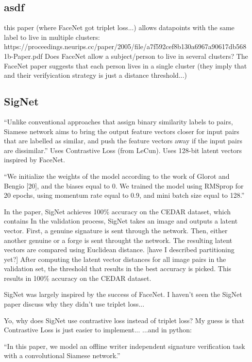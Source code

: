 \subsection{asdf}
this paper (where FaceNet got triplet loss...) allows datapoints with the same label to live in multiple clusters:
https://proceedings.neurips.cc/paper/2005/file/a7f592cef8b130a6967a90617db5681b-Paper.pdf
Does FaceNet allow a subject/person to live in several clusters?
The FaceNet paper suggests that each person lives in a single cluster (they imply that and their verifyication strategy is just a distance threshold...)

\subsection{SigNet}
``Unlike conventional approaches that assign
binary similarity labels to pairs, Siamese network aims to bring
the output feature vectors closer for input pairs that are labelled
as similar, and push the feature vectors away if the input pairs
are dissimilar.''
Uses Contrastive Loss (from LeCun).
Uses 128-bit latent vectors inspired by FaceNet.

``We initialize the weights of the model according to the work
of Glorot and Bengio [20], and the biases equal to 0. We trained
the model using RMSprop for 20 epochs, using momentum rate
equal to 0.9, and mini batch size equal to 128.''

In the paper, SigNet achieves 100\% accuracy on the CEDAR dataset, which contains 
In the validation process, SigNet takes an image and outputs a latent vector.
First, a genuine signature is sent through the network.
Then, either another genuine or a forge is sent throught the network.
The resulting latent vectors are compared using Euclidean distance.
[have I described partitioning yet?]
After computing the latent vector distances for all image pairs in the validation set, the threshold that results in the best accuracy is picked.
This results in 100\% accuracy on the CEDAR dataset.

SigNet was largely inspired by the success of FaceNet.
I haven't seen the SigNet paper discuss why they didn't use triplet loss...

Yo, why does SigNet use contrastive loss instead of triplet loss?
    My guess is that Contrastive Loss is just easier to implement...
\cite{sig_net}
\cite{GitHub_sounakdey}
...and in python: \cite{GitHub_signet_pytorch}

``In this paper, we model an offline writer independent
signature verification task with a convolutional Siamese network.''\cite{sig_net}


